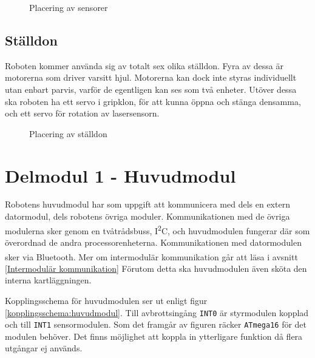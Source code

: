 \documentclass[11pt]{article}
\begin{document}
\begin{flushleft}
\begin{figure}[htbp]
\centering
\noindent\resizebox{.8\linewidth}{!}{
	}
	\caption{Placering av sensorer \label{sensor}}	
\end{figure}

\subsection{Ställdon}
Roboten kommer använda sig av totalt sex olika ställdon. Fyra av dessa är motorerna som driver varsitt hjul. Motorerna kan dock inte styras individuellt utan enbart parvis, varför de egentligen kan ses som två enheter. Utöver dessa ska roboten ha ett servo i gripklon, för att kunna öppna och stänga densamma, och ett servo för rotation av lasersensorn.

\begin{figure}[htbp]
\centering
\noindent\resizebox{.8\linewidth}{!}{
	}
	\caption{Placering av ställdon \label{ställdon}}	
\end{figure}

\clearpage
\section{Delmodul 1 - Huvudmodul}
Robotens huvudmodul har som uppgift att kommunicera med dels en extern datormodul, dels robotens övriga moduler. Kommunikationen med de övriga modulerna sker genom en tvåtrådsbuss, I\textsuperscript{2}C, och huvudmodulen fungerar där som överordnad de andra processorenheterna. Kommunikationen med datormodulen sker via  Bluetooth\textsuperscript{\circledR}. Mer om intermodulär kommunikation går att läsa i avsnitt \ref{Intermodulär kommunikation} Förutom detta ska huvudmodulen även sköta den interna kartläggningen. 

Kopplingsschema för huvudmodulen ser ut enligt figur \ref{kopplingsschema:huvudmodul}. Till avbrottsingång \verb+INT0+ är styrmodulen kopplad och till  \verb+INT1+ sensormodulen. Som det framgår av figuren räcker \verb+ATmega16+ för det modulen behöver. Det finns möjlighet att koppla in ytterligare funktion då flera utgångar ej används.  


\end{flushleft}
\end{document}
